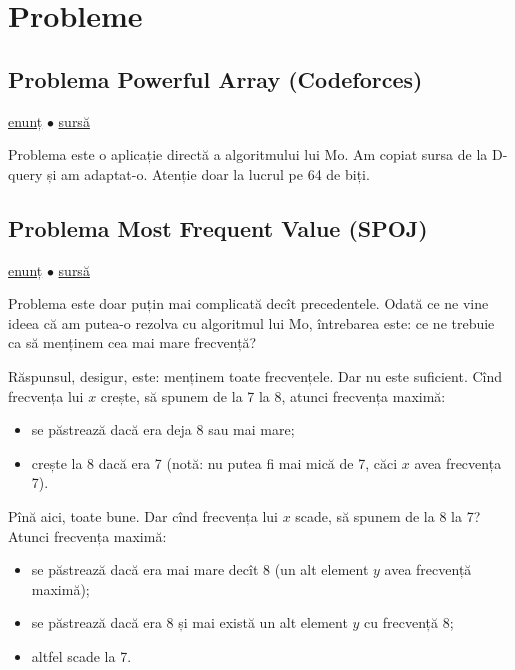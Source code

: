 \section{Probleme}

\subsection{Problema Powerful Array (Codeforces)}
\label{problem:powerful-array}

\href{https://codeforces.com/contest/86/problem/D}{enunț}
$\bullet$
\hyperref[code:powerful-array]{sursă}

Problema este o aplicație directă a algoritmului lui Mo. Am copiat sursa de la D-query și am adaptat-o. Atenție doar la lucrul pe 64 de biți.

\subsection{Problema Most Frequent Value (SPOJ)}
\label{problem:most-frequent-value}

\href{https://www.spoj.com/problems/FREQ2/}{enunț}
$\bullet$
\hyperref[code:most-frequent-value]{sursă}

Problema este doar puțin mai complicată decît precedentele. Odată ce ne vine ideea că am putea-o rezolva cu algoritmul lui Mo, întrebarea este: ce ne trebuie ca să menținem cea mai mare frecvență?

Răspunsul, desigur, este: menținem toate frecvențele. Dar nu este suficient. Cînd frecvența lui $x$ crește, să spunem de la 7 la 8, atunci frecvența maximă:

\begin{itemize}
  \item se păstrează dacă era deja 8 sau mai mare;
  \item crește la 8 dacă era 7 (notă: nu putea fi mai mică de 7, căci $x$ avea frecvența 7).
\end{itemize}

Pînă aici, toate bune. Dar cînd frecvența lui $x$ scade, să spunem de la 8 la 7? Atunci frecvența maximă:

\begin{itemize}
  \item se păstrează dacă era mai mare decît 8 (un alt element $y$ avea frecvență maximă);
  \item se păstrează dacă era 8 și mai există un alt element $y$ cu frecvență 8;
  \item altfel scade la 7.
\end{itemize}

